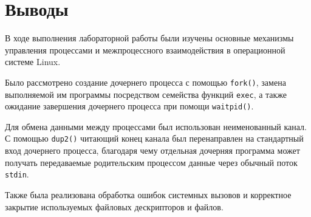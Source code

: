 \section{Выводы}

В ходе выполнения лабораторной работы были изучены основные механизмы
управления процессами и межпроцессного взаимодействия в операционной
системе Linux.

Было рассмотрено создание дочернего процесса с помощью \texttt{fork()},
замена выполняемой им программы посредством семейства функций
\texttt{exec}, а также ожидание завершения дочернего процесса при помощи
\texttt{waitpid()}.

Для обмена данными между процессами был использован неименованный канал.
С помощью \texttt{dup2()} читающий конец канала был перенаправлен на
стандартный вход дочернего процесса, благодаря чему отдельная дочерняя
программа может получать передаваемые родительским процессом данные
через обычный поток \texttt{stdin}.

Также была реализована обработка ошибок системных вызовов и корректное
закрытие используемых файловых дескрипторов и файлов.

\pagebreak